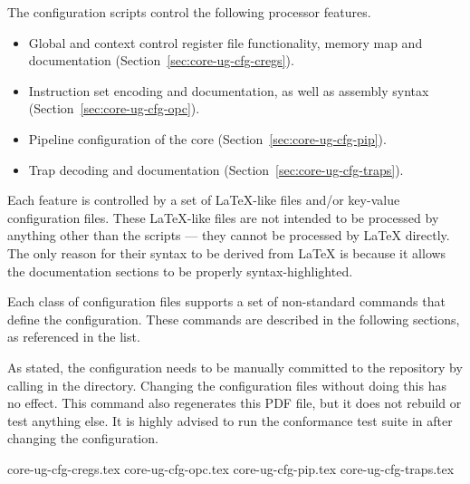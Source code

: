 The configuration scripts control the following processor features.

\begin{itemize}

\item Global and context control register file functionality, memory map and
      documentation (Section~\ref{sec:core-ug-cfg-cregs}).

\item Instruction set encoding and documentation, as well as assembly syntax
      (Section~\ref{sec:core-ug-cfg-opc}).

\item Pipeline configuration of the \rvex{} core
      (Section~\ref{sec:core-ug-cfg-pip}).

\item Trap decoding and documentation
      (Section~\ref{sec:core-ug-cfg-traps}).

\end{itemize}

\noindent Each feature is controlled by a set of LaTeX-like files and/or 
key-value configuration files. These LaTeX-like files are not intended to be 
processed by anything other than the scripts --- they cannot be processed by 
LaTeX directly. The only reason for their syntax to be derived from LaTeX is 
because it allows the documentation sections to be properly syntax-highlighted.

Each class of configuration files supports a set of non-standard commands that 
define the configuration. These commands are described in the following
sections, as referenced in the list.

As stated, the configuration needs to be manually committed to the repository
by calling  in the  directory. Changing the
configuration files without doing this has no effect. This command also
regenerates this PDF file, but it does not rebuild or test anything else. It is
highly advised to run the conformance test suite in 
after changing the configuration.


{core-ug-cfg-cregs.tex}
{core-ug-cfg-opc.tex}
{core-ug-cfg-pip.tex}
{core-ug-cfg-traps.tex}
